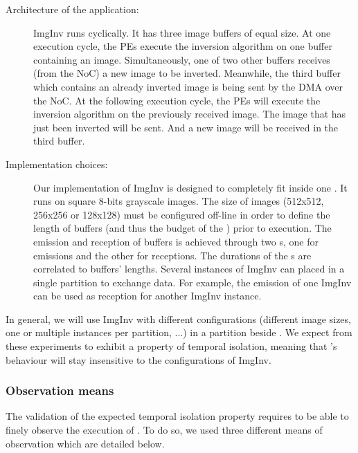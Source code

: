 \documentclass[main.tex]{subfiles}
\begin{document}
\begin{description}
    \item[Architecture of the application: ] ImgInv runs cyclically. It has three image buffers of equal size. At one execution cycle, the PEs execute the inversion algorithm on one buffer containing an image. Simultaneously, one of two other buffers receives (from the NoC) a new image to be inverted. Meanwhile, the third buffer which contains an already inverted image is being sent by the DMA over the NoC. At the following execution cycle, the PEs will execute the inversion algorithm on the previously received image. The image that has just been inverted will be sent. And a new image will be received in the third buffer.
    \item[Implementation choices: ] Our implementation of ImgInv is designed to completely fit inside one \PN{}. It runs on square 8-bits grayscale images. The size of images (512x512, 256x256 or 128x128) must be configured off-line in order to define the length of buffers (and thus the budget of the \PN{}) prior to execution. The emission and reception of buffers is achieved through two \PC{}s, one for emissions and the other for receptions. The durations of the \PC{}s are correlated to buffers' lengths. Several instances of ImgInv can placed in a single partition to exchange data. For example, the emission \PC{} of one ImgInv \PN{} can be used as reception \PC{} for another ImgInv instance.
\end{description}

In general, we will use ImgInv with different configurations (different image sizes, one or multiple instances per partition, ...) in a partition beside \rosace. We expect from these experiments to exhibit a property of temporal isolation, meaning that \rosace's behaviour will stay insensitive to the configurations of ImgInv.

\subsubsection{Observation means}
The validation of the expected temporal isolation property requires to be able to finely observe the execution of \rosace. To do so, we used three different means of observation which are detailed below.
\end{document}
